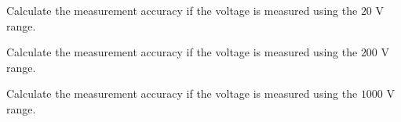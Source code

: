 \documentclass[11pt]{article}
\begin{document}


\begin{question}


\answer{}

\end{question}

\begin{question}

\begin{subquestion}{Calculate the measurement accuracy if the voltage is measured using the $20$ V range.} 
\answer{}
\end{subquestion}
\begin{subquestion}{Calculate the measurement accuracy if the voltage is measured using the $200$ V range.} 
\answer{}
\end{subquestion}

\begin{subquestion}{Calculate the measurement accuracy if the voltage is measured using the $1000$ V range.} 
\answer{}
\end{subquestion}


\end{question}


\begin{question}


\end{question}

\end{document}
